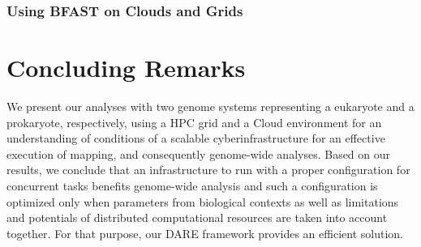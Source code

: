 \documentclass[12pt]{article}
\begin{document}
\subsubsection{Using BFAST on Clouds and Grids}


\section{Concluding Remarks}
We present our analyses with two genome systems representing a eukaryote and a prokaryote, respectively, using
 a HPC grid and a Cloud environment for an understanding of conditions of a scalable cyberinfrastructure for an effective execution of
 mapping, and consequently genome-wide analyses.   Based on our results, we conclude that an infrastructure to run with a proper configuration for concurrent tasks benefits genome-wide analysis and such a configuration is optimized only when parameters from biological contexts as well as limitations and potentials of distributed computational resources are taken into account together.  For that purpose, our DARE framework provides an efficient solution.  





\end{document}
